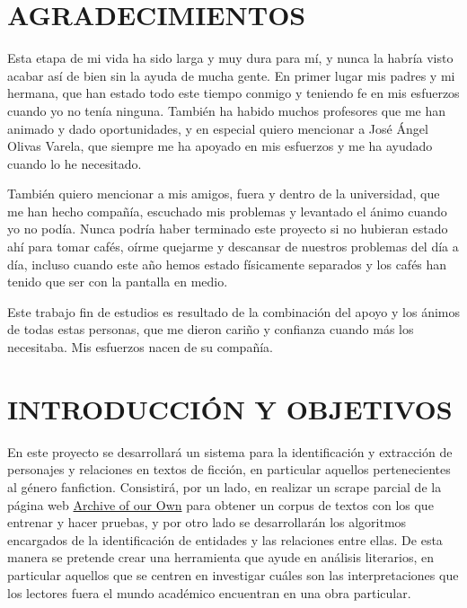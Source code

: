 \documentclass{pre-tfg}
\begin{document}
\cleardoublepage

\section{AGRADECIMIENTOS}
Esta etapa de mi vida ha sido larga y muy dura para mí, y nunca la habría visto acabar así de bien sin la ayuda de mucha gente. En primer lugar mis padres y mi hermana, que han estado todo este tiempo conmigo y teniendo fe en mis esfuerzos cuando yo no tenía ninguna. También ha habido muchos profesores que me han animado y dado oportunidades, y en especial quiero mencionar a José Ángel Olivas Varela, que siempre me ha apoyado en mis esfuerzos y me ha ayudado cuando lo he necesitado.

También quiero mencionar a mis amigos, fuera y dentro de la universidad, que me han hecho compañía, escuchado mis problemas y levantado el ánimo cuando yo no podía. Nunca podría haber terminado este proyecto si no hubieran estado ahí para tomar cafés, oírme quejarme y descansar de nuestros problemas del día a día, incluso cuando este año hemos estado físicamente separados y los cafés han tenido que ser con la pantalla en medio.

Este trabajo fin de estudios es resultado de la combinación del apoyo y los ánimos de todas estas personas, que me dieron cariño y confianza cuando más los necesitaba. Mis esfuerzos nacen de su compañía.

\cleardoublepage


\section{INTRODUCCIÓN Y OBJETIVOS}
\label{sec:intro}
En este proyecto se desarrollará un sistema para la identificación y extracción de personajes y relaciones en textos de ficción, en particular aquellos pertenecientes al género fanfiction. Consistirá, por un lado, en realizar un scrape parcial de la página web \href{https://www.archiveofourown.org/}{Archive of our Own} para obtener un corpus de textos con los que entrenar y hacer pruebas, y por otro lado se desarrollarán los algoritmos encargados de la identificación de entidades y las relaciones entre ellas. De esta manera se pretende crear una herramienta que ayude en análisis literarios, en particular aquellos que se centren en investigar cuáles son las interpretaciones que los lectores fuera el mundo académico encuentran en una obra particular. 
\end{document}
